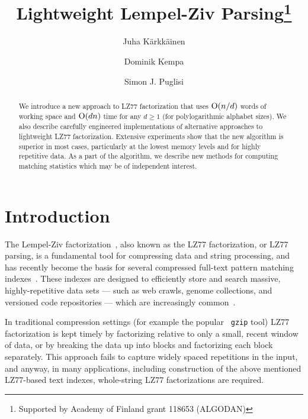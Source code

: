 \documentclass[runningheads]{llncs}
\def\O{\mbox{\rm O}}
\begin{document}
\title{Lightweight Lempel-Ziv Parsing\thanks{Supported by Academy of Finland grant 118653 (ALGODAN)}}

\author{
Juha K{\"a}rkk{\"a}inen
\and
Dominik Kempa
\and
Simon J. Puglisi
}


\date{}

\maketitle \thispagestyle{empty}


\begin{abstract}

  We introduce a new approach to LZ77 factorization that uses
  $\O(n/d)$ words of working space and $\O(dn)$ time for any $d\ge 1$
  (for polylogarithmic alphabet sizes). We also describe carefully
  engineered implementations of alternative approaches to lightweight 
  LZ77 factorization. Extensive experiments show that the
  new algorithm is superior in most cases, particularly at the lowest
  memory levels and for highly repetitive data. As a part of the
  algorithm, we describe new methods for computing matching statistics
  which may be of independent interest.

\end{abstract}

\section{Introduction}
\label{sec-intro}

The Lempel-Ziv factorization~\cite{ZL77}, also known as the LZ77
factorization, or LZ77 parsing, is a fundamental tool for compressing
data and string processing, and has recently become the basis for
several compressed full-text pattern matching
indexes~\cite{kn2011,ggknp2012}. These indexes are designed to
efficiently store and search massive, highly-repetitive data sets ---
such as web crawls, genome collections, and versioned code
repositories --- which are increasingly common~\cite{n2012}.

In traditional compression settings (for example the popular {\tt
  gzip} tool) LZ77 factorization is kept timely by factorizing
relative to only a small, recent window of data, or by breaking the
data up into blocks and factorizing each block separately. This
approach fails to capture widely spaced repetitions in the input, and
anyway, in many applications, including construction of the above
mentioned LZ77-based text indexes, whole-string LZ77 factorizations
are required.
\end{document}
